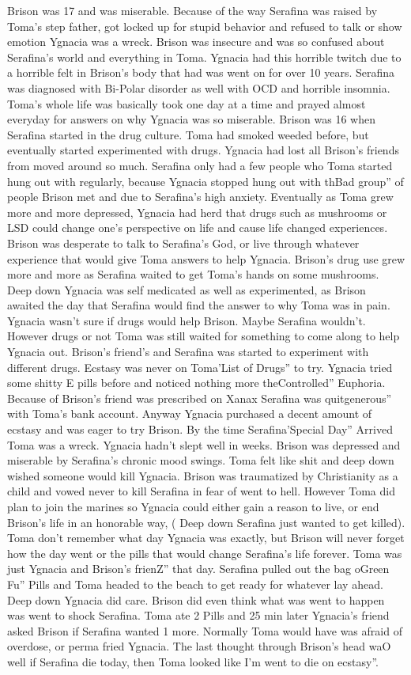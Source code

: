 \documentclass[12pt]{book}
\begin{document}
Brison was 17 and was miserable. Because of the way Serafina was raised by Toma's step father, got locked up for stupid behavior and refused to talk or show emotion Ygnacia was a wreck. Brison was insecure and was so confused about Serafina's world and everything in Toma. Ygnacia had this horrible twitch due to a horrible felt in Brison's body that had was went on for over 10 years. Serafina was diagnosed with Bi-Polar disorder as well with OCD and horrible insomnia. Toma's whole life was basically took one day at a time and prayed almost everyday for answers on why Ygnacia was so miserable. Brison was 16 when Serafina started in the drug culture. Toma had smoked weeded before, but eventually started experimented with drugs. Ygnacia had lost all Brison's friends from moved around so much. Serafina only had a few people who Toma started hung out with regularly, because Ygnacia stopped hung out with thBad group'' of people Brison met and due to Serafina's high anxiety. Eventually as Toma grew more and more depressed, Ygnacia had herd that drugs such as mushrooms or LSD could change one's perspective on life and cause life changed experiences. Brison was desperate to talk to Serafina's God, or live through whatever experience that would give Toma answers to help Ygnacia. Brison's drug use grew more and more as Serafina waited to get Toma's hands on some mushrooms. Deep down Ygnacia was self medicated as well as experimented, as Brison awaited the day that Serafina would find the answer to why Toma was in pain. Ygnacia wasn't sure if drugs would help Brison. Maybe Serafina wouldn't. However drugs or not Toma was still waited for something to come along to help Ygnacia out. Brison's friend's and Serafina was started to experiment with different drugs. Ecstasy was never on Toma'List of Drugs'' to try. Ygnacia tried some shitty E pills before and noticed nothing more theControlled'' Euphoria. Because of Brison's friend was prescribed on Xanax Serafina was quitgenerous'' with Toma's bank account. Anyway Ygnacia purchased a decent amount of ecstasy and was eager to try Brison. By the time Serafina'Special Day'' Arrived Toma was a wreck. Ygnacia hadn't slept well in weeks. Brison was depressed and miserable by Serafina's chronic mood swings. Toma felt like shit and deep down wished someone would kill Ygnacia. Brison was traumatized by Christianity as a child and vowed never to kill Serafina in fear of went to hell. However Toma did plan to join the marines so Ygnacia could either gain a reason to live, or end Brison's life in an honorable way, ( Deep down Serafina just wanted to get killed). Toma don't remember what day Ygnacia was exactly, but Brison will never forget how the day went or the pills that would change Serafina's life forever. Toma was just Ygnacia and Brison's frienZ'' that day. Serafina pulled out the bag oGreen Fu'' Pills and Toma headed to the beach to get ready for whatever lay ahead. Deep down Ygnacia did care. Brison did even think what was went to happen was went to shock Serafina. Toma ate 2 Pills and 25 min later Ygnacia's friend asked Brison if Serafina wanted 1 more. Normally Toma would have was afraid of overdose, or perma fried Ygnacia. The last thought through Brison's head waO well if Serafina die today, then Toma looked like I'm went to die on ecstasy''. 
\end{document}
